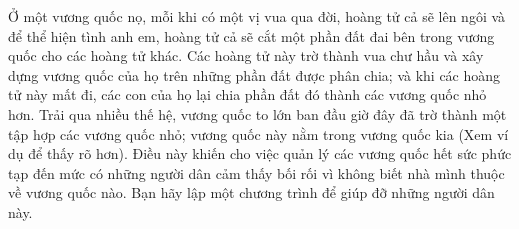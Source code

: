 Ở một vương quốc nọ, mỗi khi có một vị vua qua đời, hoàng tử cả sẽ lên ngôi và để thể hiện tình anh em, hoàng tử cả sẽ cắt một phần đất đai bên trong vương quốc cho các hoàng tử khác. Các hoàng tử này trờ thành vua chư hầu và xây dựng vương quốc của họ trên những phần đất được phân chia; và khi các hoàng tử này mất đi, các con của họ lại chia phần đất đó thành các vương quốc nhỏ hơn. Trải qua nhiều thế hệ, vương quốc to lớn ban đầu giờ đây đã trờ thành một tập hợp các vương quốc nhỏ; vương quốc này nằm trong vương quốc kia (Xem ví dụ để thấy rõ hơn). Điều này khiến cho việc quản lý các vương quốc hết sức phức tạp đến mức có những người dân cảm thấy bối rối vì không biết nhà mình thuộc về vương quốc nào. Bạn hãy lập một chương trình để giúp đỡ những người dân này.